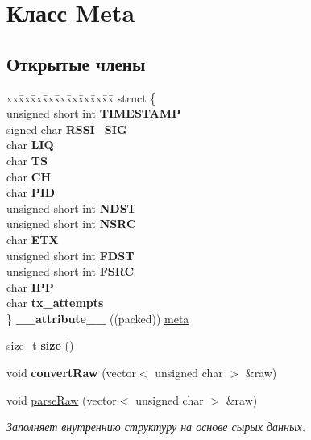 \hypertarget{classMeta}{}\section{Класс Meta}
\label{classMeta}
\subsection*{Открытые члены}
\begin{DoxyCompactItemize}
\item 
\mbox{\label{classMeta_ac7e6750ca437719e2b190e1fbae1efe2}} 
\begin{tabbing}
xx\=xx\=xx\=xx\=xx\=xx\=xx\=xx\=xx\=\kill
struct \{\\
\>unsigned short int {\bfseries TIMESTAMP}\\
\>signed char {\bfseries RSSI\_SIG}\\
\>char {\bfseries LIQ}\\
\>char {\bfseries TS}\\
\>char {\bfseries CH}\\
\>char {\bfseries PID}\\
\>unsigned short int {\bfseries NDST}\\
\>unsigned short int {\bfseries NSRC}\\
\>char {\bfseries ETX}\\
\>unsigned short int {\bfseries FDST}\\
\>unsigned short int {\bfseries FSRC}\\
\>char {\bfseries IPP}\\
\>char {\bfseries tx\_attempts}\\
\} {\bfseries \_\_attribute\_\_} ((packed)) \hyperlink{structmeta}{meta}\\

\end{tabbing}\item 
\mbox{\label{classMeta_a6b4e2e99a1a92eb96ae2554322c50320}} 
size\+\_\+t {\bfseries size} ()
\item 
\mbox{\label{classMeta_a2e94ae8b3cc5a94220d52c1dc42abfb7}} 
void {\bfseries convert\+Raw} (vector$<$ unsigned char $>$ \&raw)
\item 
void \hyperlink{classMeta_a75ca6d184c5d5af3148f7657ba6671e4}{parse\+Raw} (vector$<$ unsigned char $>$ \&raw)
\begin{DoxyCompactList}\small\item\em Заполняет внутреннию структуру на основе сырых данных. \end{DoxyCompactList}\end{DoxyCompactItemize}


